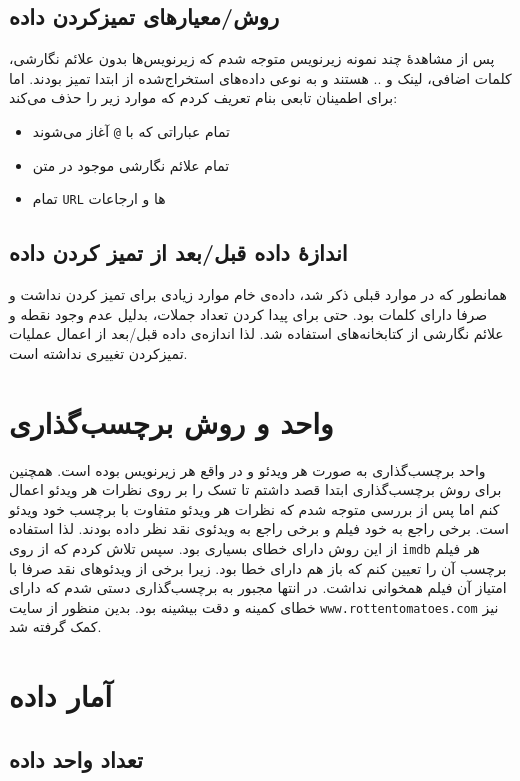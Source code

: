 \subsection{روش/معیارهای تمیزکردن داده}
پس از مشاهدۀ چند نمونه زیرنویس متوجه شدم که زیرنویس‌ها بدون علائم نگارشی، کلمات اضافی، لینک و .. هستند و به نوعی داده‌های استخراج‌شده از ابتدا تمیز بودند. اما برای اطمینان تابعی بنام  تعریف کردم که موارد زیر را حذف می‌کند:
\begin{itemize}
    \item تمام عباراتی که با \texttt{@} آغاز می‌شوند
    \item تمام علائم نگارشی موجود در متن
    \item تمام \texttt{URL} ها و ارجاعات
\end{itemize}

\clearpage

\subsection{اندازۀ داده قبل/بعد از تمیز کردن داده}
همانطور که در موارد قبلی ذکر شد، داده‌ی خام موارد زیادی برای تمیز کردن نداشت و صرفا دارای کلمات بود. حتی برای پیدا کردن تعداد جملات، بدلیل عدم وجود نقطه و علائم نگارشی از کتابخانه‌های  استفاده شد. لذا اندازه‌ی داده قبل/بعد از اعمال عملیات تمیزکردن تغییری نداشته است.

\section{واحد و روش برچسب‌گذاری}
واحد برچسب‌گذاری به صورت هر ویدئو و در واقع هر زیرنویس بوده است. همچنین برای روش برچسب‌گذاری ابتدا قصد داشتم تا تسک  را بر روی نظرات هر ویدئو اعمال کنم اما پس از بررسی متوجه شدم که نظرات هر ویدئو متفاوت با برچسب خود ویدئو است. برخی راجع به خود فیلم و برخی راجع به ویدئوی نقد نظر داده بودند. لذا استفاده از این روش دارای خطای بسیاری بود. سپس تلاش کردم که از روی \texttt{imdb} هر فیلم برچسب آن را تعیین کنم که باز هم دارای خطا بود. زیرا برخی از ویدئوهای نقد صرفا با امتیاز آن فیلم همخوانی نداشت. در انتها مجبور به برچسب‌گذاری دستی شدم که دارای خطای کمینه و دقت بیشینه بود. بدین منظور از سایت \texttt{www.rottentomatoes.com} نیز کمک گرفته شد.

\section{آمار داده}
\subsection{تعداد واحد داده}
\begin{center}
\end{center}
